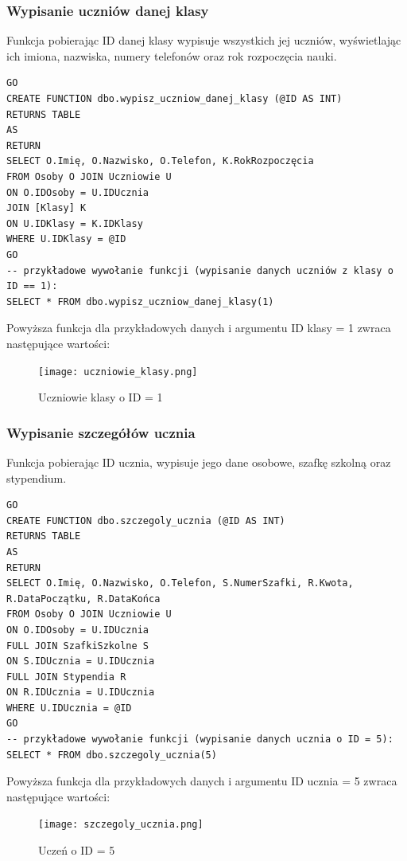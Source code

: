 \documentclass[60pt]{article}
\begin{document}
\subsubsection{Wypisanie uczniów danej klasy}

Funkcja pobierając ID danej klasy wypisuje wszystkich jej uczniów, wyświetlając ich imiona, nazwiska, numery telefonów oraz rok rozpoczęcia nauki. 

\begin{verbatim}
GO
CREATE FUNCTION dbo.wypisz_uczniow_danej_klasy (@ID AS INT)
RETURNS TABLE
AS
RETURN
SELECT O.Imię, O.Nazwisko, O.Telefon, K.RokRozpoczęcia
FROM Osoby O JOIN Uczniowie U
ON O.IDOsoby = U.IDUcznia
JOIN [Klasy] K
ON U.IDKlasy = K.IDKlasy
WHERE U.IDKlasy = @ID
GO
-- przykładowe wywołanie funkcji (wypisanie danych uczniów z klasy o ID == 1):
SELECT * FROM dbo.wypisz_uczniow_danej_klasy(1)
\end{verbatim}

Powyższa funkcja dla przykładowych danych i argumentu ID klasy = 1 zwraca następujące wartości:

\begin{figure}[h]
  \texttt{[image: uczniowie\_klasy.png]}
  \caption{Uczniowie klasy o ID = 1}
  \label{Uczniowie klasy o ID = 1}
\end{figure}

\subsubsection{Wypisanie szczegółów ucznia}

Funkcja pobierając ID ucznia, wypisuje jego dane osobowe, szafkę szkolną oraz stypendium. 

\begin{verbatim}
GO
CREATE FUNCTION dbo.szczegoly_ucznia (@ID AS INT)
RETURNS TABLE
AS
RETURN
SELECT O.Imię, O.Nazwisko, O.Telefon, S.NumerSzafki, R.Kwota, R.DataPoczątku, R.DataKońca
FROM Osoby O JOIN Uczniowie U
ON O.IDOsoby = U.IDUcznia
FULL JOIN SzafkiSzkolne S
ON S.IDUcznia = U.IDUcznia
FULL JOIN Stypendia R
ON R.IDUcznia = U.IDUcznia
WHERE U.IDUcznia = @ID
GO
-- przykładowe wywołanie funkcji (wypisanie danych ucznia o ID = 5):
SELECT * FROM dbo.szczegoly_ucznia(5)
\end{verbatim}

Powyższa funkcja dla przykładowych danych i argumentu ID ucznia = 5 zwraca następujące wartości:

\begin{figure}[h]
  \texttt{[image: szczegoly\_ucznia.png]}
  \caption{Uczeń o ID = 5}
  \label{Uczeń o ID = 5}
\end{figure}
\end{document}
